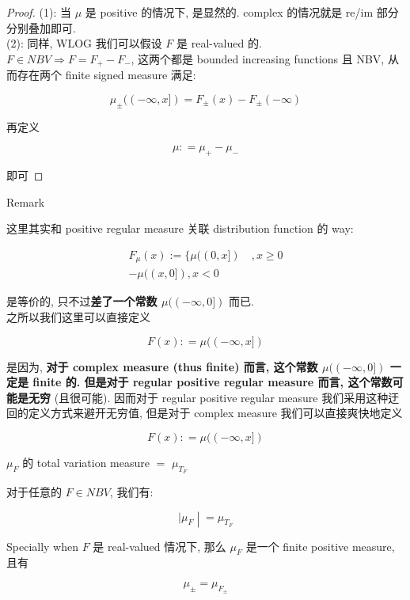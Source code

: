 \documentclass{qlnotes-export}
\begin{document}
\begin{proof}

(1): 当 \(\mu\) 是 positive 的情况下, 是显然的. complex 的情况就是 re/im 部分分别叠加即可.\\
(2): 同样, WLOG 我们可以假设 \(F\) 是 real-valued 的.\\
\(F \in NBV\Longrightarrow F = F_{+} - F_{-}\), 这两个都是 bounded increasing functions 且 NBV, 从而存在两个 finite signed measure 满足:

\[\mu_{\pm}(( - \infty,x\rbrack) = F_{\pm}(x) - F_{\pm}( - \infty)\]

再定义

\[\mu: = \mu_{+} - \mu_{-}\]

即可

\end{proof}

\begin{qlremark}{Remark}

这里其实和 positive regular measure 关联 distribution function 的 way:

\[\begin{matrix}
{F_{\mu}(x) := \{\mu((0,x\rbrack)\quad,x \geq 0} \\
{- \mu((x,0\rbrack),x < 0}
\end{matrix}\]

是等价的, 只不过\textbf{差了一个常数 \(\mu(( - \infty,0\rbrack)\)} 而已.\\
之所以我们这里可以直接定义

\[F(x): = \mu(( - \infty,x\rbrack)\]

是因为, \textbf{对于 complex measure (thus finite) 而言, 这个常数 \(\mu(( - \infty,0\rbrack)\) 一定是 finite 的. 但是对于 regular positive regular measure 而言, 这个常数可能是无穷} (且很可能). 因而对于 regular positive regular measure 我们采用这种迂回的定义方式来避开无穷值, 但是对于 complex measure 我们可以直接爽快地定义

\[F(x): = \mu(( - \infty,x\rbrack)\]

\end{qlremark}

\begin{theorem}{\(\mu_{F}\) 的 total variation measure \(=\) \(\mu_{T_{F}}\)}\label{thm-12-differentiation-on-real-spaces-mu-f-total-variation-measure-mu-t-f}

对于任意的 \(F \in NBV\), 我们有:

\[\left. |\mu_{F} \middle| = \mu_{T_{F}} \right.\]

Specially when \(F\) 是 real-valued 情况下, 那么 \(\mu_{F}\) 是一个 finite positive measure, 且有

\[\mu_{\pm} = \mu_{F_{\pm}}\]

\end{theorem}
\end{document}
